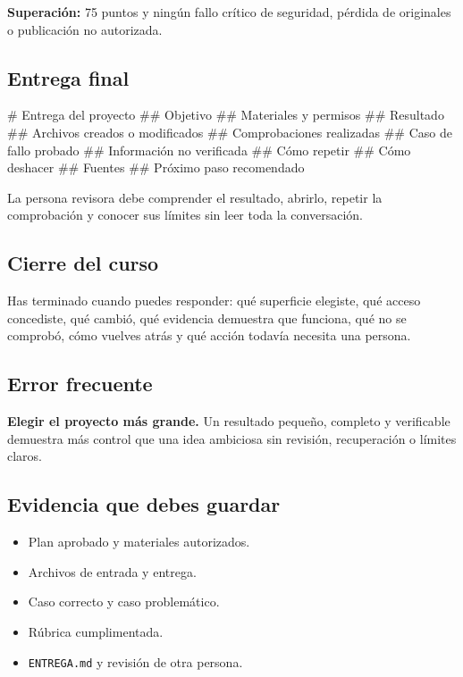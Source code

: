 \documentclass[10pt,a4paper,openany]{book}
\providecommand{\tightlist}{\setlength{\itemsep}{0.18em}\setlength{\parskip}{0pt}}
\newenvironment{Shaded}{}{}
\newcommand{\FunctionTok}[1]{\textcolor[rgb]{0.02,0.16,0.49}{#1}}
\renewenvironment{Shaded}
  {\begin{tcolorbox}[
    enhanced,
    breakable,
    colback=CodeBg,
    colframe=Border,
    boxrule=0.5pt,
    arc=2mm,
    left=3mm,
    right=3mm,
    top=2.2mm,
    bottom=2.2mm,
    before skip=0.8em,
    after skip=0.9em
  ]}
  {\end{tcolorbox}}
\begin{document}
\textbf{Superación:} 75 puntos y ningún fallo crítico de seguridad,
pérdida de originales o publicación no autorizada.

\subsection{Entrega final}\label{entrega-final}

\begin{Shaded}
\begin{Highlighting}[]
\FunctionTok{\# Entrega del proyecto}
\FunctionTok{\#\# Objetivo}
\FunctionTok{\#\# Materiales y permisos}
\FunctionTok{\#\# Resultado}
\FunctionTok{\#\# Archivos creados o modificados}
\FunctionTok{\#\# Comprobaciones realizadas}
\FunctionTok{\#\# Caso de fallo probado}
\FunctionTok{\#\# Información no verificada}
\FunctionTok{\#\# Cómo repetir}
\FunctionTok{\#\# Cómo deshacer}
\FunctionTok{\#\# Fuentes}
\FunctionTok{\#\# Próximo paso recomendado}
\end{Highlighting}
\end{Shaded}

La persona revisora debe comprender el resultado, abrirlo, repetir la
comprobación y conocer sus límites sin leer toda la conversación.

\subsection{Cierre del curso}\label{cierre-del-curso}

Has terminado cuando puedes responder: qué superficie elegiste, qué
acceso concediste, qué cambió, qué evidencia demuestra que funciona, qué
no se comprobó, cómo vuelves atrás y qué acción todavía necesita una
persona.

\subsection{Error frecuente}\label{error-frecuente-19}

\textbf{Elegir el proyecto más grande.} Un resultado pequeño, completo y
verificable demuestra más control que una idea ambiciosa sin revisión,
recuperación o límites claros.

\subsection{Evidencia que debes
guardar}\label{evidencia-que-debes-guardar-19}

\begin{itemize}
\tightlist
\item
  Plan aprobado y materiales autorizados.
\item
  Archivos de entrada y entrega.
\item
  Caso correcto y caso problemático.
\item
  Rúbrica cumplimentada.
\item
  \texttt{ENTREGA.md} y revisión de otra persona.
\end{itemize}
\end{document}
